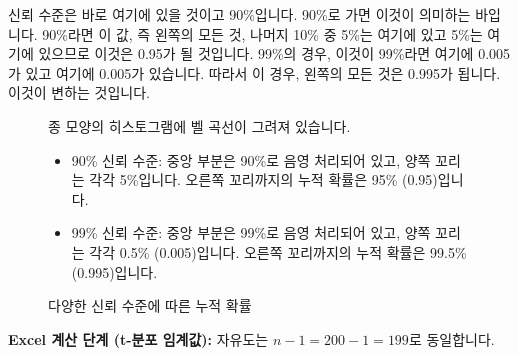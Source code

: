 \documentclass[11pt,a4paper]{book}
\theoremstyle{definition}
\begin{document}
\begin{tcolorbox}[title={슬라이드 56: 뉴욕 일일 기온 샘플 Excel 시트 (3/13)}]
신뢰 수준은 바로 여기에 있을 것이고 90\%입니다. 90\%로 가면 이것이 의미하는 바입니다. 90\%라면 이 값, 즉 왼쪽의 모든 것, 나머지 10\% 중 5\%는 여기에 있고 5\%는 여기에 있으므로 이것은 0.95가 될 것입니다. 99\%의 경우, 이것이 99\%라면 여기에 0.005가 있고 여기에 0.005가 있습니다. 따라서 이 경우, 왼쪽의 모든 것은 0.995가 됩니다. 이것이 변하는 것입니다.
\end{tcolorbox}

\begin{figure}[h!]
    \centering
    \begin{warningbox}[title=그림 설명: 다양한 신뢰 수준에 따른 누적 확률]
    종 모양의 히스토그램에 벨 곡선이 그려져 있습니다.
    \begin{itemize}
        \item 90\% 신뢰 수준: 중앙 부분은 90\%로 음영 처리되어 있고, 양쪽 꼬리는 각각 5\%입니다. 오른쪽 꼬리까지의 누적 확률은 95\% (0.95)입니다.
        \item 99\% 신뢰 수준: 중앙 부분은 99\%로 음영 처리되어 있고, 양쪽 꼬리는 각각 0.5\% (0.005)입니다. 오른쪽 꼬리까지의 누적 확률은 99.5\% (0.995)입니다.
    \end{itemize}
    \end{warningbox}
    \caption{다양한 신뢰 수준에 따른 누적 확률}
    \label{fig:confidence_level_prob}
\end{figure}

\textbf{Excel 계산 단계 (t-분포 임계값):}
자유도는 $n-1 = 200-1 = 199$로 동일합니다.
\end{document}
